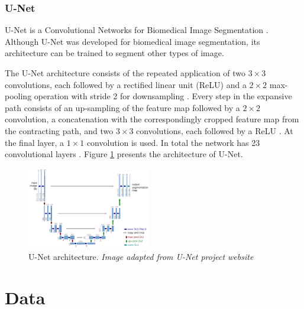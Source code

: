 \documentclass[10pt,twocolumn,letterpaper]{article}
\begin{document}
\subsubsection{U-Net} \label{sssec:unet}

U-Net is a Convolutional Networks for Biomedical Image Segmentation \cite{UNET} \cite{UNET_WEBSITE}. Although U-Net was developed for biomedical image segmentation, its architecture can be trained to segment other types of image.

The U-Net architecture consists of the repeated application of two $3 \times 3$ convolutions, each followed by a rectified linear unit (ReLU) and a $2 \times 2$ max-pooling operation with stride 2 for downsampling \cite{UNET}. Every step in the expansive path consists of an up-sampling of the feature map followed by a $2 \times 2$ convolution, a concatenation with the correspondingly cropped feature map from the contracting path, and two $3 \times 3$ convolutions, each followed by a ReLU \cite{UNET}. At the final layer, a $1 \times 1$ convolution is used. In total the network has 23 convolutional layers \cite{UNET}. Figure \ref{fig:unet} presents the architecture of U-Net.

\begin{figure}[ht]
  \centering
  \includegraphics[width=0.48\textwidth]{unet.png}
  \caption{U-Net architecture. \textit{Image adapted from U-Net project website} \cite{UNET_WEBSITE} \cite{UNET}}
  \label{fig:unet}
\end{figure}


\section{Data} \label{sec:data}

\end{document}
